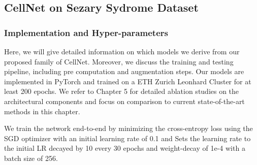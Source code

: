 \subsection{CellNet on Sezary Sydrome Dataset}

\subsubsection{Implementation and Hyper-parameters}
Here, we will give detailed information on which models we derive from our proposed family of CellNet. Moreover, we discuss the training and testing pipeline, including pre computation and augmentation steps. Our models are implemented in PyTorch and trained on a ETH Zurich Leonhard Cluster for at least 200 epochs. We refer to Chapter 5 for detailed ablation studies on the architectural components and focus on comparison to current state-of-the-art methods in this chapter.

We train the network end-to-end by minimizing the cross-entropy loss using the SGD optimizer  with an initial learning rate of 0.1 and Sets the learning rate to the initial LR decayed by 10 every 30 epochs and weight-decay of 1e-4  with a batch size of 256.

